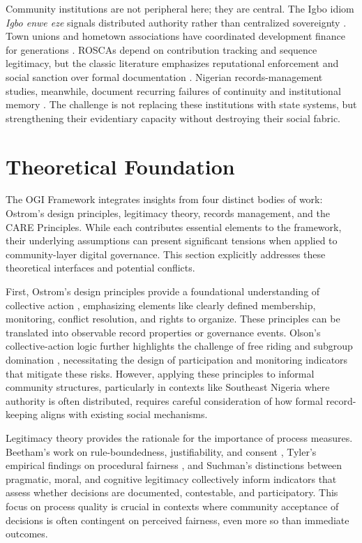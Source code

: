 \documentclass[sigconf,anonymous]{acmart}
\begin{document}
Community institutions are not peripheral here; they are central. The Igbo idiom \textit{Igbo enwe eze} signals distributed authority rather than centralized sovereignty \cite{okafor1992}. Town unions and hometown associations have coordinated development finance for generations \cite{honey1998, uduku2002}. ROSCAs depend on contribution tracking and sequence legitimacy, but the classic literature emphasizes reputational enforcement and social sanction over formal documentation \cite{ardener1964, besley1993}. Nigerian records-management studies, meanwhile, document recurring failures of continuity and institutional memory \cite{abioye2007}. The challenge is not replacing these institutions with state systems, but strengthening their evidentiary capacity without destroying their social fabric.

\section{Theoretical Foundation}

The OGI Framework integrates insights from four distinct bodies of work: Ostrom’s design principles, legitimacy theory, records management, and the CARE Principles. While each contributes essential elements to the framework, their underlying assumptions can present significant tensions when applied to community-layer digital governance. This section explicitly addresses these theoretical interfaces and potential conflicts.

First, Ostrom’s design principles provide a foundational understanding of collective action \cite{ostrom1990}, emphasizing elements like clearly defined membership, monitoring, conflict resolution, and rights to organize. These principles can be translated into observable record properties or governance events. Olson’s collective-action logic further highlights the challenge of free riding and subgroup domination \cite{olson1965}, necessitating the design of participation and monitoring indicators that mitigate these risks. However, applying these principles to informal community structures, particularly in contexts like Southeast Nigeria where authority is often distributed, requires careful consideration of how formal record-keeping aligns with existing social mechanisms.

Legitimacy theory provides the rationale for the importance of process measures. Beetham’s work on rule-boundedness, justifiability, and consent \cite{beetham2013}, Tyler’s empirical findings on procedural fairness \cite{tyler2006}, and Suchman’s distinctions between pragmatic, moral, and cognitive legitimacy \cite{suchman1995} collectively inform indicators that assess whether decisions are documented, contestable, and participatory. This focus on process quality is crucial in contexts where community acceptance of decisions is often contingent on perceived fairness, even more so than immediate outcomes.
\end{document}
